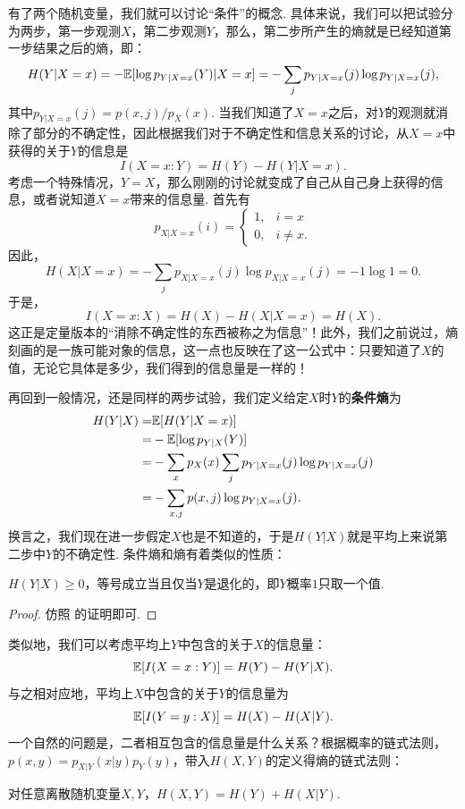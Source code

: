 有了两个随机变量，我们就可以讨论“条件”的概念. 具体来说，我们可以把试验分为两步，第一步观测$X$，第二步观测$Y$，那么，第二步所产生的熵就是已经知道第一步结果之后的熵，即：
\[H(Y| X=x)=-\mathbb{E}[\log p_{Y| X=x}(Y)| X=x]=-\sum_{j}p_{Y|X=x}(j)\log p_{Y|X=x}(j),\]
其中$p_{Y|X=x}(j)=p(x,j)/p_X(x)$. 当我们知道了$X=x$之后，对$Y$的观测就消除了部分的不确定性，因此根据我们对于不确定性和信息关系的讨论，从$X=x$中获得的关于$Y$的信息是
\[I(X=x:Y)=H(Y)-H(Y|X=x).\]
考虑一个特殊情况，$Y=X$，那么刚刚的讨论就变成了自己从自己身上获得的信息，或者说知道$X=x$带来的信息量. 首先有
\[p_{X|X=x}(i)=\begin{cases}
    1,&i=x\\
    0,&i\ne x.
\end{cases}\]
因此，
\[H(X| X=x)=-\sum_{j}p_{X|X=x}(j)\log p_{X|X=x}(j)=-1\log 1=0.\]
于是，
\[I(X=x:X)=H(X)-H(X|X=x)=H(X).\]
这正是定量版本的“消除不确定性的东西被称之为信息”！此外，我们之前说过，熵刻画的是一族可能对象的信息，这一点也反映在了这一公式中：只要知道了$X$的值，无论它具体是多少，我们得到的信息量是一样的！

再回到一般情况，还是同样的两步试验，我们定义给定$X$时$Y$的\textbf{条件熵}为
\begin{align*}
    H(Y| X)=&\mathbb{E}[H(Y|X=x)]\\
    =&-\mathbb{E}[\log p_{Y| X}(Y)]\\
    =&-\sum_x p_{X}(x)\sum_{j}p_{Y|X=x}(j)\log p_{Y|X=x}(j)\\
    =&-\sum_{x,j}p(x,j)\log p_{Y|X=x}(j).
\end{align*}
换言之，我们现在进一步假定$X$也是不知道的，于是$H(Y|X)$就是平均上来说第二步中$Y$的不确定性. 条件熵和熵有着类似的性质：
\begin{proposition}\label{prop:conditional-entropy-nonnegative}
    $H(Y|X)\geq 0$，等号成立当且仅当$Y$是退化的，即$Y$概率$1$只取一个值.
\end{proposition}
\begin{proof}
    仿照 的证明即可.
\end{proof}
类似地，我们可以考虑平均上$Y$中包含的关于$X$的信息量：
\[\mathbb{E}[I(X=x:Y)]=H(Y)-H(Y|X).\]
与之相对应地，平均上$X$中包含的关于$Y$的信息量为
\[\mathbb{E}[I(Y=y:X)]=H(X)-H(X|Y).\]
一个自然的问题是，二者相互包含的信息量是什么关系？根据概率的链式法则，$p(x,y)=p_{X|Y}(x|y)p_Y(y)$，带入$H(X,Y)$的定义得熵的链式法则：

\begin{proposition}\label{prop:entropy-chain-rule}
    对任意离散随机变量$X,Y$，$H(X,Y)=H(Y)+H(X|Y)$.    
\end{proposition}

